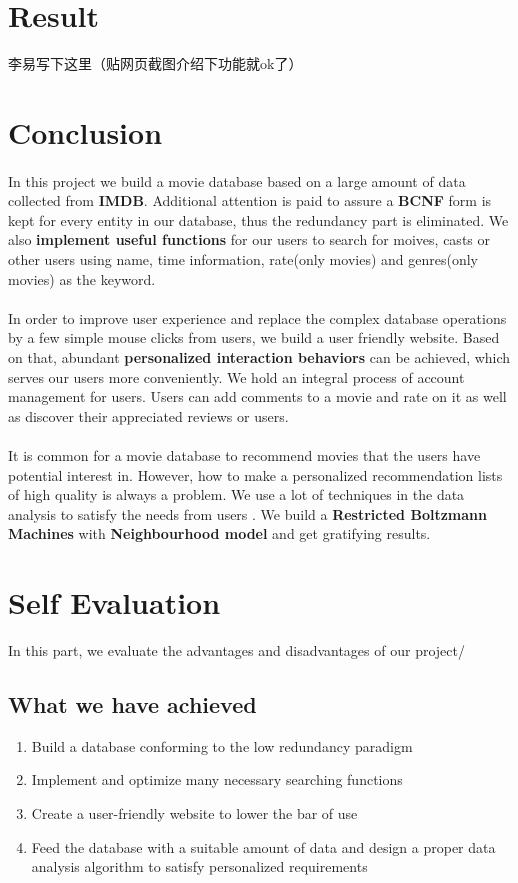 \begin{CJK*}{UTF8}{gbsn}
\section{Result}
李易写下这里（贴网页截图介绍下功能就ok了）

\section{Conclusion}
\paragraph{} In this project we build a movie database based on a large amount of data collected from \textbf{IMDB}. Additional attention is paid to assure a \textbf{BCNF} form is kept for every entity in our database, thus the redundancy part is eliminated. We also \textbf{implement useful functions} for our users to search for moives, casts or other users using name,  time information, rate(only movies) and genres(only movies) as the keyword.
\paragraph{} In order to improve user experience and replace the complex database operations by a few simple mouse clicks from users, we build a user friendly website. Based on that, abundant \textbf{personalized interaction behaviors} can be achieved, which serves our users more conveniently. We hold an integral process of account management for users. Users can add comments to a movie and rate on it as well as discover their appreciated reviews or users.
\paragraph{} It is common for a movie database to recommend movies that the users have potential interest in. However,  how to make a personalized recommendation lists of high quality is always a problem. We use a lot of techniques in the data analysis to satisfy the needs from users . We build a \textbf{Restricted Boltzmann Machines}  with \textbf{Neighbourhood model} and get gratifying results.
\section{Self Evaluation}
In this part, we evaluate the advantages and disadvantages of our project/
\subsection{What we have achieved}
\begin{enumerate}
\item Build a database conforming to the low redundancy paradigm
\item Implement and optimize many necessary  searching functions
\item Create a user-friendly website to lower the bar of use
\item Feed the database with a suitable amount of data and design a proper data analysis algorithm to satisfy personalized requirements
\end{enumerate}

\end{CJK*}
